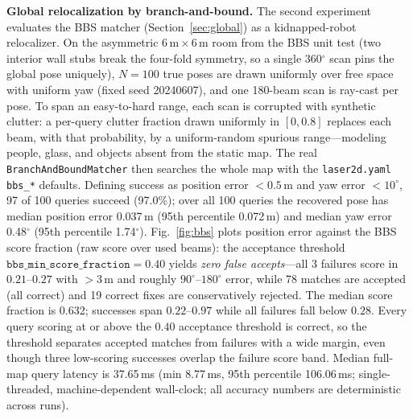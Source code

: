 \textbf{Global relocalization by branch-and-bound.}
The second experiment evaluates the BBS matcher
(Section~\ref{sec:global}) as a kidnapped-robot relocalizer. On the
asymmetric $6\,\mathrm{m} \times 6\,\mathrm{m}$ room from the BBS unit
test (two interior wall stubs break the four-fold symmetry, so a single
360$^\circ$ scan pins the global pose uniquely), $N=100$ true poses are
drawn uniformly over free space with uniform yaw (fixed seed 20240607),
and one 180-beam scan is ray-cast per pose. To span an easy-to-hard
range, each scan is corrupted with synthetic clutter: a per-query
clutter fraction drawn uniformly in $[0, 0.8]$ replaces each beam, with
that probability, by a uniform-random spurious range---modeling people,
glass, and objects absent from the static map. The real
\texttt{BranchAndBoundMatcher} then searches the whole map with the
\texttt{laser2d.yaml} \texttt{bbs\_*} defaults. Defining success as
position error $< 0.5$\,m and yaw error $< 10^\circ$, 97 of 100 queries
succeed (97.0\%); over all 100 queries the recovered pose has median
position error 0.037\,m (95th percentile 0.072\,m) and median yaw error
0.48$^\circ$ (95th percentile 1.74$^\circ$). Fig.~\ref{fig:bbs} plots
position error against the BBS score fraction (raw score over used
beams): the acceptance threshold
$\texttt{bbs\_min\_score\_fraction}=0.40$ yields \emph{zero false
accepts}---all 3 failures score in $0.21$--$0.27$ with $>3$\,m and
roughly $90^\circ$--$180^\circ$ error, while 78 matches are accepted
(all correct) and 19 correct fixes are conservatively rejected. The
median score fraction is 0.632; successes span $0.22$--$0.97$ while all
failures fall below $0.28$. Every query scoring at or above the $0.40$
acceptance threshold is correct, so the threshold separates accepted
matches from failures with a wide margin, even though three low-scoring
successes overlap the failure score band. Median full-map query latency is 37.65\,ms (min 8.77\,ms, 95th
percentile 106.06\,ms; single-threaded, machine-dependent wall-clock;
all accuracy numbers are deterministic across runs).




